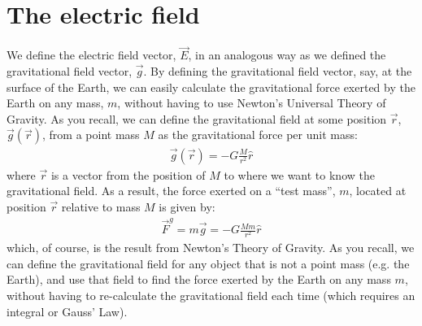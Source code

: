 \section{The electric field}
We define the electric field vector, $\vec E$, in an analogous way as we defined the gravitational field vector, $\vec g$. By defining the gravitational field vector, say, at the surface of the Earth, we can easily calculate the gravitational force exerted by the Earth on any mass, $m$, without having to use Newton's Universal Theory of Gravity. As you recall, we can define the gravitational field at some position $\vec r$, $\vec g(\vec r)$, from a point mass $M$ as the gravitational force per unit mass:
\begin{align*}
\vec g(\vec r) = -G \frac{M}{r^2}\hat r
\end{align*}
where $\vec r$ is a vector from the position of $M$ to where we want to know the gravitational field. As a result, the force exerted on a ``test mass'', $m$, located at position $\vec r$ relative to mass $M$ is given by:
\begin{align*}
\vec F^g=m\vec g= -G\frac{Mm}{r^2}\hat r
\end{align*}
which, of course, is the result from Newton's Theory of Gravity. As you recall, we can define the gravitational field for  any object that is not a point mass (e.g. the Earth), and use that field to find the force exerted by the Earth on any mass $m$, without having to re-calculate the gravitational field each time (which requires an integral or Gauss' Law). 


